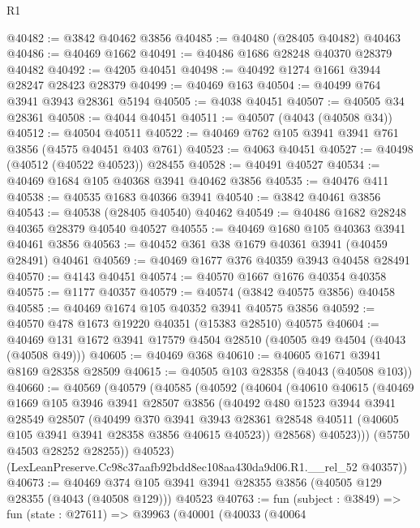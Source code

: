 \begin{lexlean}{R1}
\begin{coremodule}
@40482 := @3842 @40462 @3856
@40485 := @40480 (@28405 @40482) @40463
@40486 := @40469 @1662
@40491 := @40486 @1686 @28248 @40370 @28379 @40482
@40492 := @4205 @40451
@40498 := @40492 @1274 @1661 @3944 @28247 @28423 @28379
@40499 := @40469 @163
@40504 := @40499 @764 @3941 @3943 @28361 @5194
@40505 := @4038 @40451
@40507 := @40505 @34 @28361
@40508 := @4044 @40451
@40511 := @40507 (@4043 (@40508 @34))
@40512 := @40504 @40511
@40522 := @40469 @762 @105 @3941 @3941 @761 @3856 (@4575 @40451 @403 @761)
@40523 := @4063 @40451
@40527 := @40498 (@40512 (@40522 @40523)) @28455
@40528 := @40491 @40527
@40534 := @40469 @1684 @105 @40368 @3941 @40462 @3856
@40535 := @40476 @411
@40538 := @40535 @1683 @40366 @3941
@40540 := @3842 @40461 @3856
@40543 := @40538 (@28405 @40540) @40462
@40549 := @40486 @1682 @28248 @40365 @28379 @40540 @40527
@40555 := @40469 @1680 @105 @40363 @3941 @40461 @3856
@40563 := @40452 @361 @38 @1679 @40361 @3941 (@40459 @28491) @40461
@40569 := @40469 @1677 @376 @40359 @3943 @40458 @28491
@40570 := @4143 @40451
@40574 := @40570 @1667 @1676 @40354 @40358
@40575 := @1177 @40357
@40579 := @40574 (@3842 @40575 @3856) @40458
@40585 := @40469 @1674 @105 @40352 @3941 @40575 @3856
@40592 := @40570 @478 @1673 @19220 @40351 (@15383 @28510) @40575
@40604 := @40469 @131 @1672 @3941 @17579 @4504 @28510 (@40505 @49 @4504 (@4043 (@40508 @49)))
@40605 := @40469 @368
@40610 := @40605 @1671 @3941 @8169 @28358 @28509
@40615 := @40505 @103 @28358 (@4043 (@40508 @103))
@40660 := @40569
    (@40579
      (@40585
        (@40592
          (@40604
            (@40610
              @40615
              (@40469
                @1669
                @105
                @3946
                @3941
                @28507
                @3856
                (@40492
                  @480
                  @1523
                  @3944
                  @3941
                  @28549
                  @28507
                  (@40499
                    @370
                    @3941
                    @3943
                    @28361
                    @28548
                    @40511
                    (@40605 @105 @3941 @3941 @28358 @3856 @40615 @40523))
                  @28568)
                @40523)))
          (@5750 @4503 @28252 @28255))
        @40523)
      (LexLeanPreserve.Cc98c37aafb92bdd8ec108aa430da9d06.R1.__rel_52 @40357))
@40673 := @40469
    @374
    @105
    @3941
    @3941
    @28355
    @3856
    (@40505 @129 @28355 (@4043 (@40508 @129)))
    @40523
@40763 := fun (subject : @3849) =>
  fun (state : @27611) =>
  @39963
    (@40001
      (@40033
        (@40064

\end{coremodule}
\end{lexlean}
